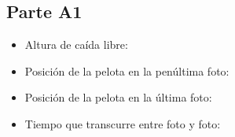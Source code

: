 \subsection{Parte A1}%
\label{sub:parte_a1}

\begin{itemize}
	\item Altura de caída libre:
	\item Posición de la pelota en la penúltima foto:
	\item Posición de la pelota en la última foto:
	\item Tiempo que transcurre entre foto y foto:
\end{itemize}

